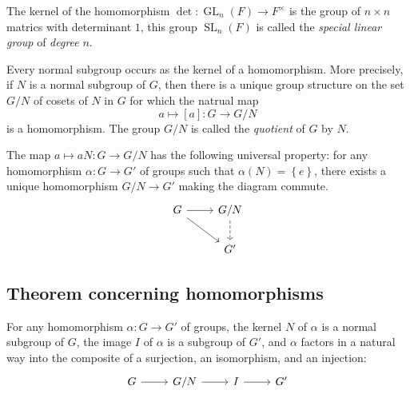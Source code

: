 \begin{example}
  The kernel of the homomorphism \( \det: \operatorname{GL}_n(F) \to F^\times \) is the group of \( n \times n \) matrics with determinant \( 1 \), this group \( \operatorname{SL}_n(F) \) is called the \emph{special linear group} of \emph{degree} \( n \).
\end{example}

\begin{proposition}
  Every normal subgroup occurs as the kernel of a homomorphism.
  More precisely, if \( N \) is a normal subgroup of \( G \), then there is a unique group structure on the set \( G / N \) of cosets of \( N \) in \( G \) for which the natrual map
  \[
    a \mapsto [a] : G \to G / N
  \]
  is a homomorphism.
  The group \( G / N \) is called the \emph{quotient} of \( G  \) by \( N \).
\end{proposition}

\begin{proposition}
  The map \( a \mapsto a N: G \to G / N \) has the following universal property:
  for any homomorphism \( \alpha: G \to G' \) of groups such that \( \alpha(N) = \left\lbrace e \right\rbrace \), there exists a unique homomorphism \( G / N \to G' \) making the diagram commute.
  \[\begin{tikzcd}
    G & { G/ N} \\
    & {G'}
    \arrow[from=1-1, to=1-2]
    \arrow[from=1-1, to=2-2]
    \arrow[dashed, from=1-2, to=2-2]
  \end{tikzcd}\]
\end{proposition}

\subsection{Theorem concerning homomorphisms}

\begin{theorem}[Homomorphism]
  For any homomorphism \( \alpha: G \to G' \) of groups, the kernel \( N \) of \( \alpha \) is a normal subgroup of \( G \), the image \( I \) of \( \alpha \) is a subgroup of \( G' \), and \( \alpha \) factors in a natural way into the composite of a surjection, an isomorphism, and an injection:
  \[\begin{tikzcd}
    G & {G/N} & I & {G'}
    \arrow[from=1-1, to=1-2]
    \arrow[from=1-2, to=1-3]
    \arrow[from=1-3, to=1-4]
  \end{tikzcd}\]
\end{theorem}

